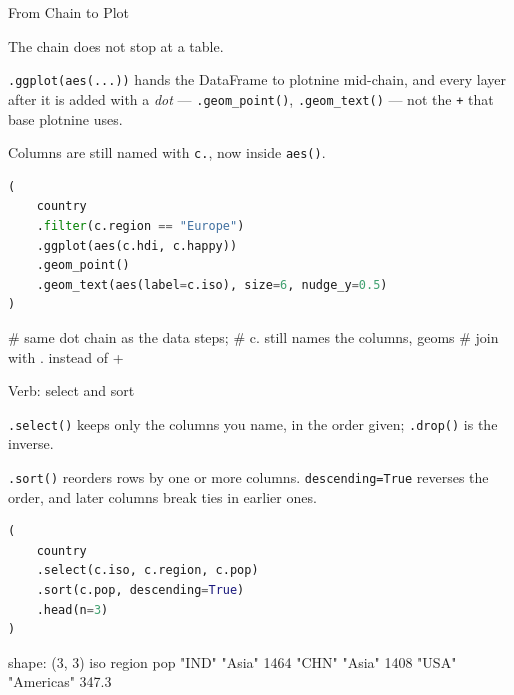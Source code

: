 \documentclass[8pt,aspectratio=169]{beamer}
\begin{document}
\begin{frame}[fragile]{From Chain to Plot}
\begin{splitcode}{%

The chain does not stop at a table.

\texttt{.ggplot(aes(...))} hands the DataFrame to plotnine mid-chain, and every layer after it is added with a \textit{dot} --- \texttt{.geom\_point()}, \texttt{.geom\_text()} --- not the \texttt{+} that base plotnine uses.

Columns are still named with \texttt{c.}, now inside \texttt{aes()}.

}
\begin{lstlisting}[language=Python]
(
    country
    .filter(c.region == "Europe")
    .ggplot(aes(c.hdi, c.happy))
    .geom_point()
    .geom_text(aes(label=c.iso), size=6, nudge_y=0.5)
)
\end{lstlisting}
\begin{codeoutput}
# same dot chain as the data steps;
# c. still names the columns, geoms
# join with . instead of +
\end{codeoutput}
\end{splitcode}
\end{frame}

\begin{frame}[fragile]{Verb: select and sort}
\begin{splitcode}{%

\texttt{.select()} keeps only the columns you name, in the order given; \texttt{.drop()} is the inverse.

\texttt{.sort()} reorders rows by one or more columns. \texttt{descending=True} reverses the order, and later columns break ties in earlier ones.

}
\begin{lstlisting}[language=Python]
(
    country
    .select(c.iso, c.region, c.pop)
    .sort(c.pop, descending=True)
    .head(n=3)
)
\end{lstlisting}
\begin{codeoutput}
shape: (3, 3)
iso    region      pop
"IND"  "Asia"      1464
"CHN"  "Asia"      1408
"USA"  "Americas"  347.3
\end{codeoutput}
\end{splitcode}
\end{frame}
\end{document}
